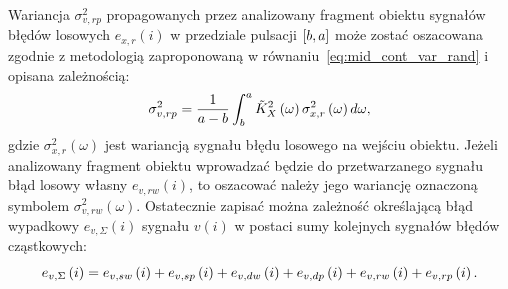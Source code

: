 Wariancja $\sigma_{v,rp}^{2}$ propagowanych przez analizowany fragment obiektu sygnałów błędów losowych $e_{x,r}(i)$ w przedziale pulsacji $\interval{b}{a}$ może zostać oszacowana zgodnie z metodologią zaproponowaną w równaniu~\eqref{eq:mid_cont_var_rand} i opisana zależnością:
\begin{equation}
\sigma_{v,rp}^{2} = \frac{1}{a - b} \int _{b} ^{a} \tilde{K}_{X}^{2} \left(\omega\right) \sigma_{x,r}^{2} \left(\omega\right) d\omega \label{eq:mid_disc_var_rand},
\end{equation}
gdzie $\sigma_{x,r}^{2}(\omega)$ jest wariancją sygnału błędu losowego na wejściu obiektu. Jeżeli analizowany fragment obiektu wprowadzać będzie do przetwarzanego sygnału błąd losowy własny $e_{v,rw}(i)$, to oszacować należy jego wariancję oznaczoną symbolem $\sigma_{v,rw}^{2}(\omega)$. Ostatecznie zapisać można zależność określającą błąd wypadkowy $e_{v,\Sigma}(i)$ sygnału $v(i)$ w postaci sumy kolejnych sygnałów błędów cząstkowych:
\begin{equation}
e_{v,\Sigma} \left(i\right) = e_{v,sw} \left(i\right) + e_{v,sp} \left(i\right) + e_{v,dw} \left(i\right) + e_{v,dp} \left(i\right) + e_{v,rw} \left(i\right) + e_{v,rp} \left(i\right) \label{eq:mid_disc_err_sum_all}.
\end{equation}

